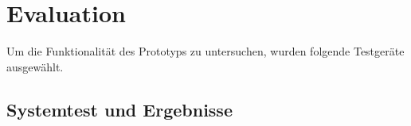 \chapter{\label{chap:evaluation}Evaluation}
Um die Funktionalität des Prototyps zu untersuchen, wurden folgende Testgeräte ausgewählt.
%
%
\section{Systemtest und Ergebnisse}